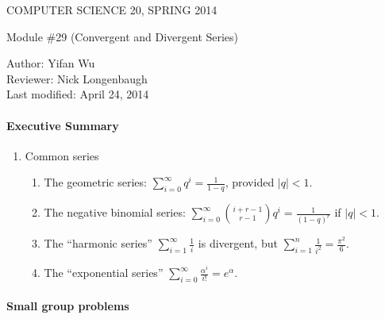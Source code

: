 \documentclass[12pt]{article}
\begin{document}
\begin{center}
COMPUTER SCIENCE 20, SPRING 2014 \\
\smallskip

Module \#29 (Convergent and Divergent Series)
\end{center}
Author: Yifan Wu\\
Reviewer: Nick Longenbaugh\\
Last modified: April 24, 2014 

\paragraph*{Executive Summary}
\begin{enumerate}

\item Common series
\begin{enumerate}
\item The geometric series: $\sum_{i=0}^{\infty} q^i = \frac{1}{1-q}$, provided $|q| < 1$.
\item The negative binomial series: $\sum_{i=0}^{\infty} \binom{i+r-1}{r-1} q^i = \frac{1}{(1-q)^r}$ if $|q| < 1$.
\item The ``harmonic series'' $\sum_{i=1}^{\infty} \frac{1}{i}$ is  divergent, but $\sum_{i=1}^n \frac{1}{i^2} = \frac{\pi^2}{6}$.
\item The ``exponential series''  $\sum_{i=0}^{\infty} \frac{\alpha^i}{i!} = e^{\alpha}$. 
\end{enumerate}

\end{enumerate}

\paragraph*{Small group problems}
\end{document}
